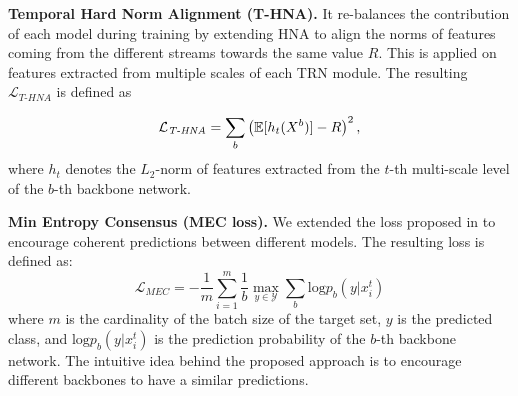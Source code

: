 \textbf{Temporal Hard Norm Alignment (T-HNA).} It re-balances the contribution of each model during training by extending HNA \cite{planamente2021crossdomain} to align the norms of features coming from the different streams towards the same value $R$. This is applied on features extracted from multiple scales of each TRN module. The resulting $\mathcal{L}_\textit{T-HNA}$ is defined as
    
    \begin{equation}\label{eq:hna}
    \mathcal{L}_\textit{T-HNA}=\sum_b\left(\operatorname{\mathbb{E}}[h_t(X^b)] - R\right)^2,
\end{equation}
where $h_t$ denotes the $L_2$-norm of features extracted from the $t$-th multi-scale level of the $b$-th backbone network. 
    
\textbf{Min Entropy Consensus (MEC loss).} We extended the loss proposed in \cite{roy2019unsupervised} to encourage coherent predictions between different models. The resulting loss is defined as:
    \begin{equation}\label{eq:hna}
    \mathcal{L}_{MEC} = - \frac{1}{m}\sum_{i=1}^{m} \frac{1}{b} \max_{y \in \mathcal{Y} }{ \sum_{b} \mathrm{log} \textit{p}_b(y | x_{i}^{t})}
    \end{equation}
where $m$ is the cardinality of the batch size of the target set, $y$ is the predicted class, and $\mathrm{log} \textit{p}_b(y | x_{i}^{t})$ is the prediction probability of the $b$-th backbone network. The intuitive idea behind the proposed approach is to encourage different backbones to have a similar predictions.


